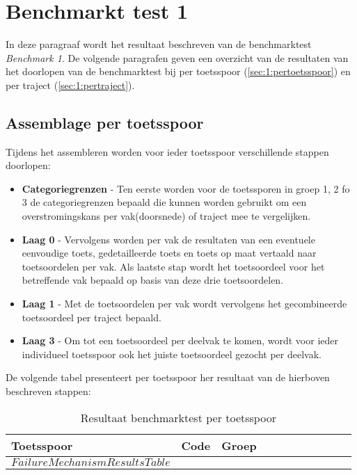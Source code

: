 \section{Benchmarkt test 1}
	\label{ch:benchmarktTest1}
In deze paragraaf wordt het resultaat beschreven van de benchmarktest \textit{Benchmark 1}. De volgende paragrafen geven een overzicht van de resultaten van het doorlopen van de benchmarktest bij per toetsspoor (\autoref{sec:1:pertoetsspoor}) en per traject (\autoref{sec:1:pertraject}).

\subsection{Assemblage per toetsspoor}
	\label{sec:1:pertoetsspoor}
Tijdens het assembleren worden voor ieder toetsspoor verschillende stappen doorlopen:
\begin{itemize}
	\item \textbf{Categoriegrenzen} - Ten eerste worden voor de toetssporen in groep 1, 2 fo 3 de categoriegrenzen bepaald die kunnen worden gebruikt om een overstromingskans per vak(doorsnede) of traject mee te vergelijken.
	\item \textbf{Laag 0} - Vervolgens worden per vak de resultaten van een eventuele eenvoudige toets, gedetailleerde toets en toets op maat vertaald naar toetsoordelen per vak. Als laatste stap wordt het toetsoordeel voor het betreffende vak bepaald op basis van deze drie toetsoordelen.
	\item \textbf{Laag 1} - Met de toetsoordelen per vak wordt vervolgens het gecombineerde toetsoordeel per traject bepaald.
	\item \textbf{Laag 3} - Om tot een toetsoordeel per deelvak te komen, wordt voor ieder individueel toetsspoor ook het juiste toetsoordeel gezocht per deelvak.
\end{itemize}

De volgende tabel presenteert per toetsspoor her resultaat van de hierboven beschreven stappen:

\begin{longtable}[]{@{}l l l | c c c c c c c c@{}}
	\caption{Resultaat benchmarktest per toetsspoor	\label{tab:DocumentatieBijAssemblageRekenkern}}\\
	\T
	Toetsspoor & Code & Groep & \rotatebox{90}{Categoriegrenzen} & \rotatebox{90}{Eenvoudige toets} & \rotatebox{90}{Gedetailleerde toets} & \rotatebox{90}{Toets op maat} & \rotatebox{90}{Toetsoordeel per vak} & \rotatebox{90}{Toetsoordeel per traject} & \rotatebox{90}{Toetsoordeel per traject (tijdelijk)} & \rotatebox{90}{Toetsoordeel per deelvak}\B \\
	\endhead
	\hline\T
$FailureMechanismResultsTable$
	\B \\ \hline
\end{longtable}

